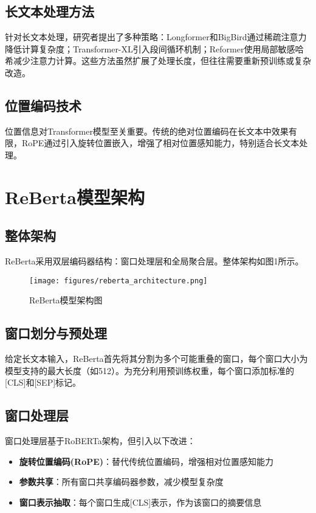 \documentclass[10pt,twocolumn,letterpaper]{article}
\begin{document}
\subsection{长文本处理方法}
针对长文本处理，研究者提出了多种策略：Longformer\citep{beltagy2020longformer}和BigBird\citep{zaheer2020big}通过稀疏注意力降低计算复杂度；Transformer-XL\citep{dai2019transformer}引入段间循环机制；Reformer\citep{kitaev2020reformer}使用局部敏感哈希减少注意力计算。这些方法虽然扩展了处理长度，但往往需要重新预训练或复杂改造。

\subsection{位置编码技术}
位置信息对Transformer模型至关重要。传统的绝对位置编码在长文本中效果有限，RoPE\citep{su2021roformer}通过引入旋转位置嵌入，增强了相对位置感知能力，特别适合长文本处理。

\section{ReBerta模型架构}
\subsection{整体架构}
ReBerta采用双层编码器结构：窗口处理层和全局聚合层。整体架构如图1所示。

\begin{figure}
\centering
\texttt{[image: figures/reberta\_architecture.png]}
\caption{ReBerta模型架构图}
\label{fig:architecture}
\end{figure}

\subsection{窗口划分与预处理}
给定长文本输入，ReBerta首先将其分割为多个可能重叠的窗口，每个窗口大小为模型支持的最大长度（如512）。为充分利用预训练权重，每个窗口添加标准的[CLS]和[SEP]标记。

\subsection{窗口处理层}
窗口处理层基于RoBERTa架构，但引入以下改进：
\begin{itemize}
    \item \textbf{旋转位置编码(RoPE)}：替代传统位置编码，增强相对位置感知能力
    \item \textbf{参数共享}：所有窗口共享编码器参数，减少模型复杂度
    \item \textbf{窗口表示抽取}：每个窗口生成[CLS]表示，作为该窗口的摘要信息
\end{itemize}
\end{document}
